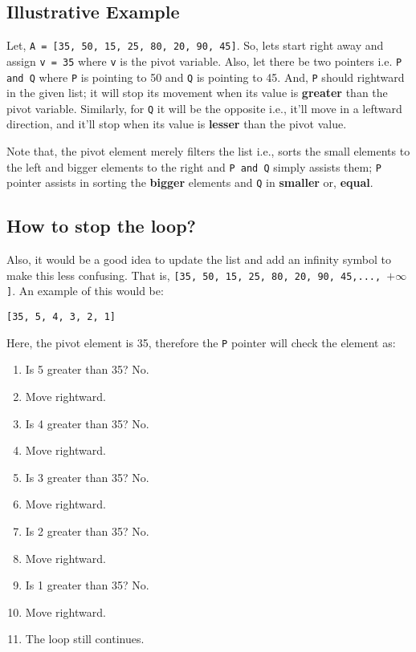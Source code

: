 \documentclass[a4paper,12pt]{article}
\theoremstyle{definition}
\begin{document}
    \subsection{Illustrative Example}

    Let, \texttt{A = [35, 50, 15, 25, 80, 20, 90, 45]}.
    So, lets start right away and assign \texttt{v = 35} where \texttt{v} is the pivot variable.
    Also, let there be two pointers i.e. \texttt{P and Q} where \texttt{P} is pointing to 50 and
    \texttt{Q} is pointing to 45.
    And, \texttt{P} should rightward in the given list; it will stop its movement when its value is \textbf{greater}
    than the pivot variable.
    Similarly, for \texttt{Q} it will be the opposite i.e., it'll move in a leftward direction, and it'll stop when
    its value is \textbf{lesser} than the pivot value.

    Note that, the pivot element merely filters the list i.e., sorts the small elements to the left and bigger
    elements to the right and \texttt{P and Q} simply assists them; \texttt{P} pointer assists in sorting the
    \textbf{bigger} elements and \texttt{Q} in \textbf{smaller} or, \textbf{equal}.

    \subsection*{How to stop the loop?}

    Also, it would be a good idea to update the list and add an infinity symbol to make this less confusing.
    That is, \texttt{[35, 50, 15, 25, 80, 20, 90, 45,..., $+\infty$]}. An example of this would be:

    \begin{center}
        \texttt{[35, 5, 4, 3, 2, 1]}
    \end{center}

    \noindent
    Here, the pivot element is 35, therefore the \texttt{P} pointer will check the element as:

    \begin{enumerate}
        \item Is 5 greater than 35? No.
        \item Move rightward.
        \item Is 4 greater than 35? No.
        \item Move rightward.
        \item Is 3 greater than 35? No.
        \item Move rightward.
        \item Is 2 greater than 35? No.
        \item Move rightward.
        \item Is 1 greater than 35? No.
        \item Move rightward.
        \item The loop still continues.
    \end{enumerate}
\end{document}
